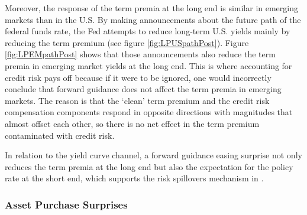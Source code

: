 {Moreover, the response of the term premia at the long end is similar in emerging markets than in the U.S.
By making announcements about the future path of the federal funds rate, the Fed attempts to reduce long-term U.S. yields mainly by reducing the term premium (see figure \ref{fig:LPUSpathPost}). Figure \ref{fig:LPEMpathPost} shows that those announcements also reduce the term premia in emerging market yields at the long end.
This is where accounting for credit risk pays off because if it were to be ignored, one would incorrectly conclude that forward guidance does not affect the term premia in emerging markets. The reason is that the `clean' term premium and the credit risk compensation components respond in opposite directions with magnitudes that almost offset each other, so there is no net effect in the term premium contaminated with credit risk.

In relation to the yield curve channel, a forward guidance easing surprise not only reduces the term premia at the long end 
but also the expectation for the policy rate at the short end, which
supports the risk spillovers mechanism in \cite{Kalemli-Ozcan:2019}.


\subsubsection{Asset Purchase Surprises}
\iftoggle{toclinks}{\gototoc}{} %

}
